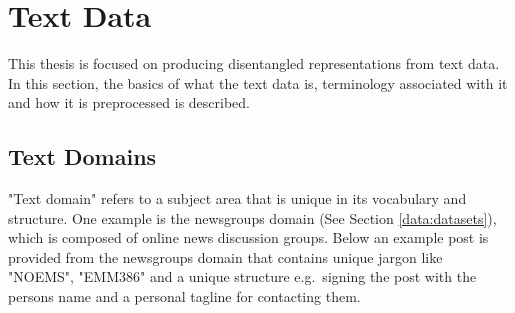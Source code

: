 















\section{Text Data}

This thesis is focused on producing disentangled representations from text data. In this section, the basics of what the text data is, terminology associated with it and how it is preprocessed is described.

\subsection{Text Domains}

"Text domain" refers to a subject area that is unique in its vocabulary and structure. One example is the newsgroups domain (See Section \ref{data:datasets}), which is composed of online news discussion groups. Below an example post is provided from the newsgroups domain that contains unique jargon like "NOEMS", "EMM386" and a unique structure e.g.\ signing the post with the persons name and a personal tagline for contacting them. %




